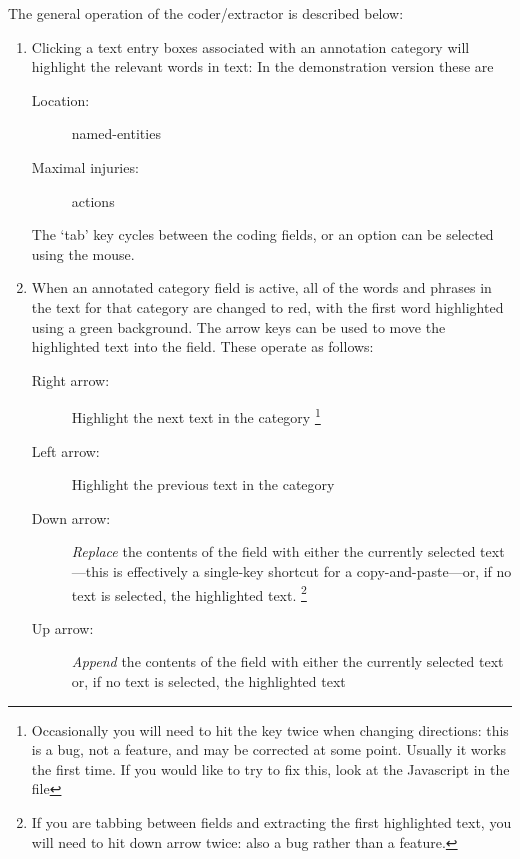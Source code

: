 \documentclass[letterpaper,10pt,english]{sphinxmanual}
\begin{document}
The general operation of the coder/extractor is described below:
\begin{enumerate}
\item {} 
Clicking a text entry boxes associated with an annotation category
will highlight the relevant words in text: In the demonstration
version these are
\begin{description}
\item[{Location:}] \leavevmode
named-entities

\item[{Maximal injuries:}] \leavevmode
actions

\end{description}

The ‘tab’ key cycles between the coding fields, or an option can be
selected using the mouse.

\item {} 
When an annotated category field is active, all of the words and
phrases in the text for that category are changed to red, with the
first word highlighted using a green background. The arrow keys can
be used to move the highlighted text into the field. These operate as
follows:
\begin{description}
\item[{Right arrow:}] \leavevmode
Highlight the next text in the category \footnote{
Occasionally you will need to hit the key twice when changing
directions: this is a bug, not a feature, and may be corrected at
some point. Usually it works the first time. If you would like to try
to fix this, look at the Javascript in the file 
}

\item[{Left arrow:}] \leavevmode
Highlight the previous text in the category

\item[{Down arrow:}] \leavevmode
\emph{Replace} the contents of the field with either the currently
selected text—this is effectively a single-key shortcut for a
copy-and-paste—or, if no text is selected, the highlighted
text. \footnote{
If you are tabbing between fields and extracting the first
highlighted text, you will need to hit down arrow twice: also a bug
rather than a feature.
}

\item[{Up arrow:}] \leavevmode
\emph{Append} the contents of the field with either the currently
selected text or, if no text is selected, the highlighted text

\end{description}


\end{enumerate}
\end{document}
